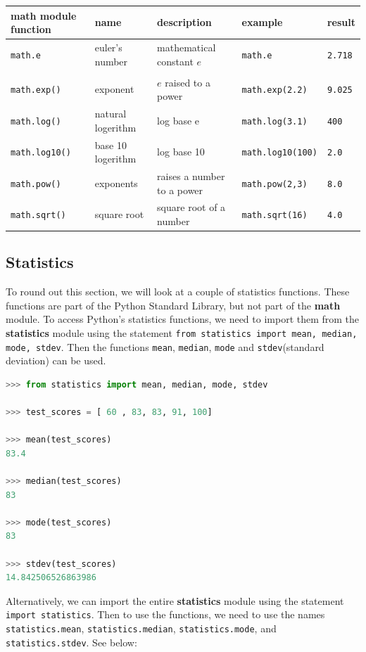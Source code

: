 \documentclass{book}
\begin{document}
\begin{longtable}[]{@{}lllll@{}}
\toprule
math module function & name & description & example &
result\tabularnewline
\midrule
\endhead
\lstinline!math.e! & euler's number & mathematical constant \(e\) &
\lstinline!math.e! & \lstinline!2.718!\tabularnewline
& & & &\tabularnewline
\lstinline!math.exp()! & exponent & \(e\) raised to a power &
\lstinline!math.exp(2.2)! & \lstinline!9.025!\tabularnewline
\lstinline!math.log()! & natural logerithm & log base e &
\lstinline!math.log(3.1)! & \lstinline!400!\tabularnewline
\lstinline!math.log10()! & base 10 logerithm & log base 10 &
\lstinline!math.log10(100)! & \lstinline!2.0!\tabularnewline
\lstinline!math.pow()! & exponents & raises a number to a power &
\lstinline!math.pow(2,3)! & \lstinline!8.0!\tabularnewline
\lstinline!math.sqrt()! & square root & square root of a number &
\lstinline!math.sqrt(16)! & \lstinline!4.0!\tabularnewline
\bottomrule
\end{longtable}
    




    
        \subsection{Statistics}\label{statistics}

To round out this section, we will look at a couple of statistics
functions. These functions are part of the Python Standard Library, but
not part of the \textbf{math} module. To access Python's statistics
functions, we need to import them from the \textbf{statistics} module
using the statement
\lstinline!from statistics import mean, median, mode, stdev!. Then the
functions \lstinline!mean!, \lstinline!median!, \lstinline!mode! and
\lstinline!stdev!(standard deviation) can be used.

\begin{lstlisting}[language=Python]
>>> from statistics import mean, median, mode, stdev
    
>>> test_scores = [ 60 , 83, 83, 91, 100]
    
>>> mean(test_scores)
83.4

>>> median(test_scores)
83

>>> mode(test_scores)
83
    
>>> stdev(test_scores)
14.842506526863986 
\end{lstlisting}

Alternatively, we can import the entire \textbf{statistics} module using
the statement \lstinline!import statistics!. Then to use the functions,
we need to use the names \lstinline!statistics.mean!,
\lstinline!statistics.median!, \lstinline!statistics.mode!, and
\lstinline!statistics.stdev!. See below:
\end{document}
